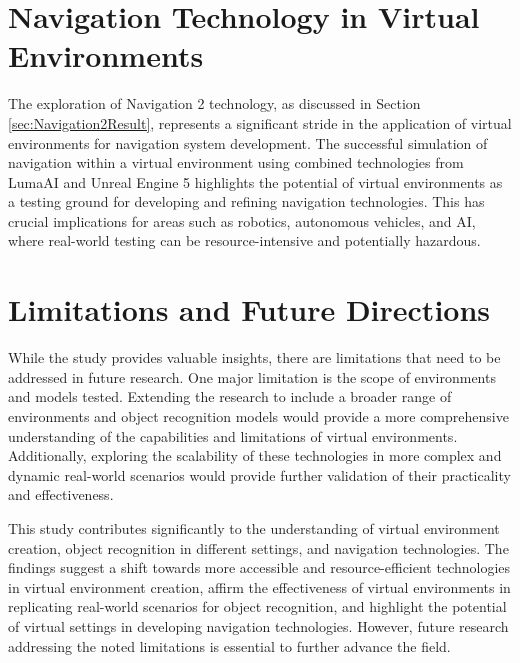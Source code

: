 \section{Navigation Technology in Virtual Environments}
\label{sec:Navigation Technology in Virtual Environments}
The exploration of Navigation 2 technology, as discussed in Section \ref{sec:Navigation2Result}, represents a significant stride in the application of virtual environments for navigation system development. The successful simulation of navigation within a virtual environment using combined technologies from LumaAI and Unreal Engine 5 highlights the potential of virtual environments as a testing ground for developing and refining navigation technologies. This has crucial implications for areas such as robotics, autonomous vehicles, and AI, where real-world testing can be resource-intensive and potentially hazardous.

\section{Limitations and Future Directions}
\label{sec:Limitations and Future Directions}
While the study provides valuable insights, there are limitations that need to be addressed in future research. One major limitation is the scope of environments and models tested. Extending the research to include a broader range of environments and object recognition models would provide a more comprehensive understanding of the capabilities and limitations of virtual environments. Additionally, exploring the scalability of these technologies in more complex and dynamic real-world scenarios would provide further validation of their practicality and effectiveness.

This study contributes significantly to the understanding of virtual environment creation, object recognition in different settings, and navigation technologies. The findings suggest a shift towards more accessible and resource-efficient technologies in virtual environment creation, affirm the effectiveness of virtual environments in replicating real-world scenarios for object recognition, and highlight the potential of virtual settings in developing navigation technologies. However, future research addressing the noted limitations is essential to further advance the field.





